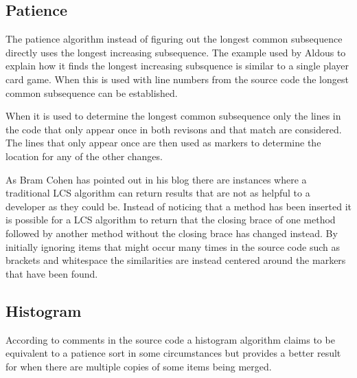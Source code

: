 
\subsection{Patience}
The patience algorithm instead of figuring out the longest common subsequence directly uses the longest increasing subsequence. 
The example used by Aldous \cite{Aldous1999} to explain how it finds the longest increasing subsquence is similar to a single player card game. 
When this is used with line numbers from the source code the longest common subsequence can be established.

When it is used to determine the longest common subsequence only the lines in the code that only appear once in both revisons and that match are considered. 
The lines that only appear once are then used as markers to determine the location for any of the other changes. 

As Bram Cohen has pointed out in his blog there are instances where a traditional LCS algorithm can return results that are not as helpful to a developer as they could be.  Instead of noticing that a method has been inserted it is possible for a LCS algorithm to return that the closing brace of one method followed by another method without the closing brace has changed instead. By initially ignoring items that might occur many times in the source code such as brackets and whitespace the similarities are instead centered around the markers that have been found. 

% 
% 

\subsection{Histogram}
According to comments in the source code a histogram algorithm claims to be equivalent to a patience sort in some circumstances but provides a better result for when there are multiple copies of some items being merged. 


